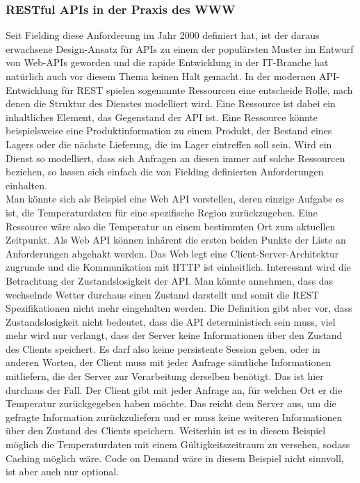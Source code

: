 \subsubsection*{RESTful APIs in der Praxis des WWW}
Seit Fielding diese Anforderung im Jahr 2000 definiert hat, ist der daraus erwachsene Design-Ansatz für APIs zu einem der populärsten Muster im Entwurf von Web-APIs geworden und die rapide Entwicklung in der IT-Branche hat natürlich auch vor diesem Thema keinen Halt gemacht. In der modernen API-Entwicklung für REST spielen sogenannte Ressourcen eine entscheide Rolle, nach denen die Struktur des Dienstes modelliert wird. Eine Ressource ist dabei ein inhaltliches Element, das Gegenstand der API ist. Eine Ressource könnte beispielsweise eine Produktinformation zu einem Produkt, der Bestand eines Lagers oder die nächste Lieferung, die im Lager eintreffen soll sein. \cite[Vgl.][S. 81]{richardson2007web} Wird ein Dienst so modelliert, dass sich Anfragen an diesen immer auf solche Ressourcen beziehen, so lassen sich einfach die von Fielding definierten Anforderungen einhalten.\\
Man könnte sich als Beispiel eine Web API vorstellen, deren einzige Aufgabe es ist, die Temperaturdaten für eine spezifische Region zurückzugeben. Eine Ressource wäre also die Temperatur an einem bestimmten Ort zum aktuellen Zeitpunkt. Als Web API können inhärent die ersten beiden Punkte der Liste an Anforderungen abgehakt werden. Das Web legt eine Client-Server-Architektur zugrunde und die Kommunikation mit HTTP ist einheitlich. Interessant wird die Betrachtung der Zustandslosigkeit der API. Man könnte annehmen, dass das wechselnde Wetter durchaus einen Zustand darstellt und somit die REST Spezifikationen nicht mehr eingehalten werden. Die Definition gibt aber vor, dass Zustandslosigkeit nicht bedeutet, dass die API deterministisch sein muss, viel mehr wird nur verlangt, dass der Server keine Informationen über den Zustand des Clients speichert. Es darf also keine persistente Session geben, oder in anderen Worten, der Client muss mit jeder Anfrage sämtliche Informationen mitliefern, die der Server zur Verarbeitung derselben benötigt. Das ist hier durchaus der Fall. Der Client gibt mit jeder Anfrage an, für welchen Ort er die Temperatur zurückgegeben haben möchte. Das reicht dem Server aus, um die gefragte Information zurückzuliefern und er muss keine weiteren Informationen über den Zustand des Clients speichern. Weiterhin ist es in diesem Beispiel möglich die Temperaturdaten mit einem Gültigkeitszeitraum zu versehen, sodass Caching möglich wäre. Code on Demand wäre in diesem Beispiel nicht sinnvoll, ist aber auch nur optional.

